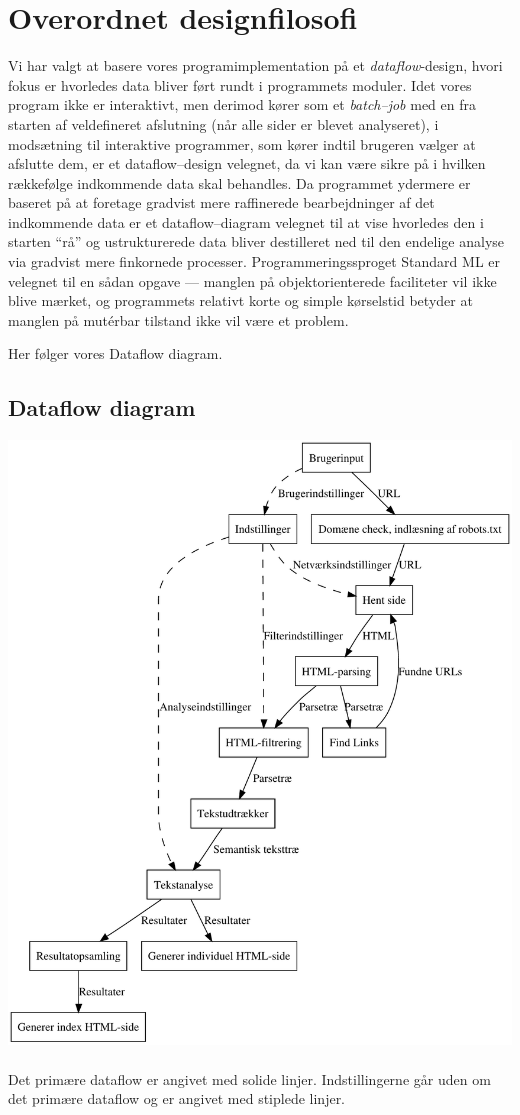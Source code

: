 \documentclass[a4paper,oneside,article]{memoir}
\begin{document}
\section{Overordnet designfilosofi}
Vi har valgt at basere vores programimplementation på et {\em
  dataflow}-design, hvori fokus er hvorledes data bliver ført rundt i
programmets moduler. Idet vores program ikke er interaktivt, men
derimod kører som et {\em batch--job} med en fra starten af
veldefineret afslutning (når alle sider er blevet analyseret), i
modsætning til interaktive programmer, som kører indtil brugeren
vælger at afslutte dem, er et dataflow--design velegnet, da vi kan
være sikre på i hvilken rækkefølge indkommende data skal behandles. Da
programmet ydermere er baseret på at foretage gradvist mere
raffinerede bearbejdninger af det indkommende data er et
dataflow--diagram velegnet til at vise hvorledes den i starten ``rå''
og ustrukturerede data bliver destilleret ned til den endelige analyse
via gradvist mere finkornede processer. Programmeringssproget Standard
ML er velegnet til en sådan opgave --- manglen på objektorienterede
faciliteter vil ikke blive mærket, og programmets relativt korte og
simple kørselstid betyder at manglen på mutérbar tilstand ikke vil
være et problem.

Her følger vores Dataflow diagram.
\subsection{Dataflow diagram}
\includegraphics[width=\textwidth]{endeligtdesignill.pdf}
\\\\
Det primære dataflow er angivet med solide linjer. Indstillingerne
går uden om det primære dataflow og er angivet med stiplede linjer.
\end{document}
